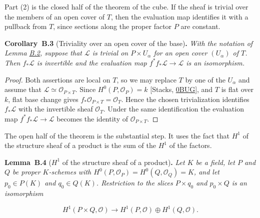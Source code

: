 \documentclass[11pt]{article}
\newenvironment{bpstatement}[2]{\par\addvspace{0.6\baselineskip}\noindent\textbf{#1}#2\textbf{.}\enspace\ignorespaces}
  {\par\addvspace{0.4\baselineskip}}
\newenvironment{bpstatementit}[2]{\begin{bpstatement}{#1}{#2}\itshape\ignorespaces}{\end{bpstatement}}
\begin{document}
\label{bp82}%
Part (2) is the closed half of the theorem of the cube. If the sheaf is trivial over the members of an open cover of \(T\), then the evaluation map identifies it with a pullback from \(T\), since sections along the proper factor \(P\) are constant.

\label{bp83}%
\begin{bpstatementit}{Corollary~B.3}{ (Triviality over an open cover of the base)}
With the notation of Lemma \hyperref[bp80]{B.2}, suppose that \(\mathcal L\) is trivial on \(P\times U_\alpha\) for an open cover \((U_\alpha)\) of \(T\). Then \(f_*\mathcal L\) is invertible and the evaluation map \(f^*f_*\mathcal L\to\mathcal L\) is an isomorphism.
\end{bpstatementit}

\begin{proof}[{Proof}]\label{bp84}%
Both assertions are local on \(T\), so we may replace \(T\) by one of the \(U_\alpha\) and assume that \(\mathcal L\simeq\mathcal O_{P\times T}\). Since \(H^0(P,\mathcal O_P)=k\) [Stacks, \href{https://stacks.math.columbia.edu/tag/0BUG}{0BUG}], and \(T\) is flat over \(k\), flat base change gives \(f_*\mathcal O_{P\times T}=\mathcal O_T\). Hence the chosen trivialization identifies \(f_*\mathcal L\) with the invertible sheaf \(\mathcal O_T\). Under the same identification the evaluation map \(f^*f_*\mathcal L\to\mathcal L\) becomes the identity of \(\mathcal O_{P\times T}\).
\end{proof}

\label{bp85}%
The open half of the theorem is the substantial step. It uses the fact that \(H^1\) of the structure sheaf of a product is the sum of the \(H^1\) of the factors.

\label{bp86}%
\begin{bpstatementit}{Lemma~B.4}{ ($H^1$ of the structure sheaf of a product)}
Let \(K\) be a field, let \(P\) and \(Q\) be proper \(K\)-schemes with \(H^0(P,\mathcal O_P)=H^0(Q,\mathcal O_Q)=K\), and let \(p_0\in P(K)\) and \(q_0\in Q(K)\). Restriction to the slices \(P\times q_0\) and \(p_0\times Q\) is an isomorphism

\[
H^1(P\times Q,\mathcal O)\longrightarrow
H^1(P,\mathcal O)\oplus H^1(Q,\mathcal O).
\]
\end{bpstatementit}
\end{document}
